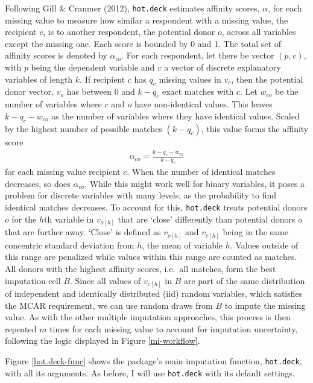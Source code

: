 \documentclass[12pt,econ]{sources/authesis}
\begin{document}
Following Gill \& Cranmer (2012), \texttt{hot.deck} estimates affinity scores, \(\alpha\), for each missing value to measure how similar a respondent with a missing value, the recipient \(c\), is to another respondent, the potential donor \(o\), across all variables except the missing one. Each score is bounded by 0 and 1. The total set of affinity scores is denoted by \(\alpha_{co}\). For each respondent, let there be vector \((p, v)\), with \(p\) being the dependent variable and \(v\) a vector of discrete explanatory variables of length \(k\). If recipient \(c\) has \(q_c\) missing values in \(v_c\), then the potential donor vector, \(v_o\) has between 0 and \(k-q_c\) exact matches with \(c\). Let \(w_{co}\) be the number of variables where \(c\) and \(o\) have non-identical values. This leaves \(k-q_c -w_{co}\) as the number of variables where they have identical values. Scaled by the highest number of possible matches \((k-q_c)\), this value forms the affinity score
\begin{align}
\alpha_{co} = \frac{k-q_c-w_{co}}{k-q_c}
\end{align}
for each missing value recipient \(c\). When the number of identical matches decreases, so does \(\alpha_{co}\). While this might work well for binary variables, it poses a problem for discrete variables with many levels, as the probability to find identical matches decreases. To account for this, \texttt{hot.deck} treats potential donors \(o\) for the \(h\)th variable in \(v_{o[h]}\) that are `close' differently than potential donors \(o\) that are further away. `Close' is defined as \(v_{o[h]}\) and \(v_{c[h]}\) being in the same concentric standard deviation from \(\overline{h}\), the mean of variable \(h\). Values outside of this range are penalized while values within this range are counted as matches. All donors with the highest affinity scores, i.e.~all matches, form the best imputation cell \(B\). Since all values of \(v_{c[h]}\) in \(B\) are part of the same distribution of independent and identically distributed (iid) random variables, which satisfies the MCAR requirement, we can use random draws from \(B\) to impute the missing value. As with the other multiple imputation approaches, this process is then repeated \(m\) times for each missing value to account for imputation uncertainty, following the logic displayed in Figure \ref{mi-workflow}.

Figure \ref{hot.deck-func} shows the package's main imputation function, \texttt{hot.deck}, with all its arguments. As before, I will use \texttt{hot.deck} with its default settings.
\end{document}

